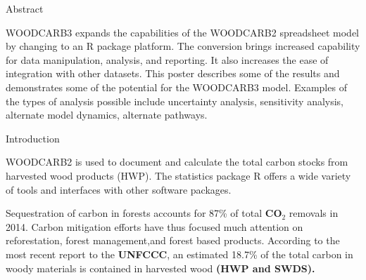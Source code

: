 \documentclass[final]{beamer}\usepackage[]{graphicx}\usepackage[]{color}
\newlength{\onecolwid}
\begin{document}
\begin{frame}[t]
\begin{columns}[t]
\begin{column}{\onecolwid} %



\begin{alertblock}{Abstract}

WOODCARB3 expands the capabilities of the WOODCARB2 spreadsheet model by changing to an R package platform. The conversion brings increased capability for data manipulation, analysis, and reporting. It also increases the ease of integration with other datasets. This poster describes some of the results and demonstrates some of the potential for the WOODCARB3 model. Examples of the types of analysis possible include uncertainty analysis, sensitivity analysis, alternate model dynamics, alternate pathways.

\vspace{0ex}

\end{alertblock}
\begin{block}{Introduction}


WOODCARB2 is used to document and calculate the total carbon stocks from harvested wood products (HWP). The statistics package R offers a wide variety of tools and interfaces with other software packages.
\vspace{1ex}

Sequestration of carbon in forests accounts for 87\% of total \textbf{CO$_{2}$} removals in 2014. Carbon mitigation efforts have thus focused much attention on reforestation, forest management,and forest based products. According to the most recent report to the \textbf{UNFCCC}, an estimated 18.7\% of the total carbon in woody materials is contained in harvested wood \textbf{(HWP and SWDS).}
\vspace{1ex}  


\end{block}
\end{column}
\end{columns}
\end{frame}
\end{document}
